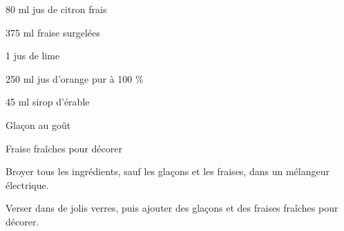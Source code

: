

\totaltime{}


\begin{ingredients}
    \item 80 ml jus de citron frais
    \item 375 ml fraise surgelées
    \item 1 jus de lime
    \item 250 ml jus d'orange pur à 100 \%
    \item 45 ml sirop d'érable
    \item Glaçon au goût
    \item Fraise fraîches pour décorer
\end{ingredients}

\begin{steps}
    \item Broyer tous les ingrédients, sauf les glaçons et les fraises, dans un mélangeur électrique.
    \item Verser dans de jolis verres, puis ajouter des glaçons et des fraises fraîches pour décorer.
\end{steps}
